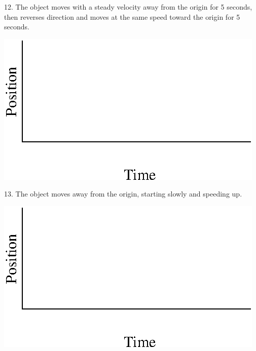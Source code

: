 12. The object moves with a steady velocity away from the origin for 5 seconds,
then reverses direction and moves at the same speed toward the origin for 5
seconds.

\vspace{0.3cm}
{\par\centering \includegraphics{position/position_fig13.eps} \par}
\vspace{0.3cm}

13. The object moves away from the origin, starting slowly and speeding up.

\vspace{0.3cm}
{\par\centering \includegraphics{position/position_fig13.eps} \par}
\vspace{0.3cm}

